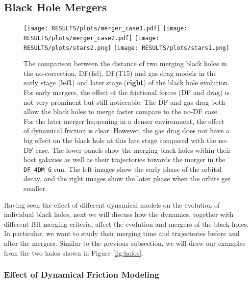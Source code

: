 \subsection{Black Hole Mergers}
\begin{figure*}
\texttt{[image: RESULTS/plots/merger\_case1.pdf]}
\texttt{[image: RESULTS/plots/merger\_case2.pdf]}
\texttt{[image: RESULTS/plots/stars2.png]}
\texttt{[image: RESULTS/plots/stars1.png]}


\caption{The comparison between the distance of two merging black holes in the no-correction, DF(fid), DF(T15) and gas drag models in the early stage (\textbf{left}) and later stage (\textbf{right}) of the black hole evolution. For early mergers, the effect of the frictional forces (DF and drag) is not very prominent but still noticeable. The DF and gas drag both allow the black holes to merge faster compare to the no-DF case. For the later merger happening in a denser environment, the effect of dynamical friction is clear. However, the gas drag does not have a big effect on the black hole at this late stage compared with the no-DF case. The lower panels show the merging black holes within their host galaxies as well as their trajectories towards the merger in the \texttt{DF\_4DM\_G} run. The left images show the early phase of the orbital decay, and the right images show the later phase when the orbits get smaller.}
\label{fig:merger_case1}
\end{figure*}
Having seen the effect of different dynamical models on the evolution of individual black holes, next we will discuss how the dynamics, together with different BH merging criteria,  affect the evolution and mergers of the black holes.
 In particular, we want to study their merging time and trajectories before and after the mergers. Similar to the previous subsection, we will draw our examples from the two halos shown in Figure {\ref{fig:halos}}.
 
\subsubsection{Effect of Dynamical  Friction Modeling}
\label{subsec:case_merger_calc}

